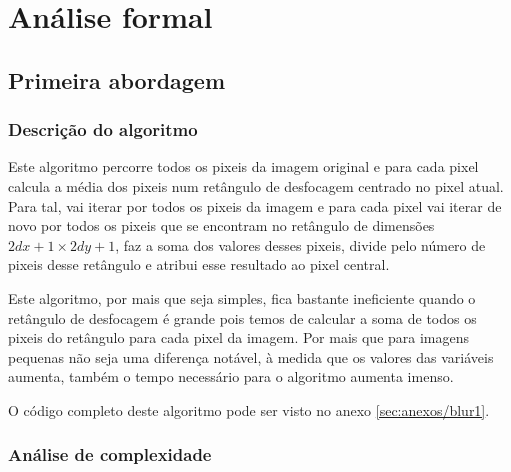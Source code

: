 \section{Análise formal}
\label{sec:imageblur/formal}

\subsection{Primeira abordagem}

\subsubsection{Descrição do algoritmo}

Este algoritmo percorre todos os pixeis da imagem original e para cada pixel calcula a média dos pixeis num retângulo de desfocagem centrado no pixel atual. Para tal, vai iterar por todos os pixeis da imagem e para cada pixel vai iterar de novo por todos os pixeis que se encontram no retângulo de dimensões $2dx+1 \times 2dy+1$, faz a soma dos valores desses pixeis, divide pelo número de pixeis desse retângulo e atribui esse resultado ao pixel central.

Este algoritmo, por mais que seja simples, fica bastante ineficiente quando o retângulo de desfocagem é grande pois temos de calcular a soma de todos os pixeis do retângulo para cada pixel da imagem. Por mais que para imagens pequenas não seja uma diferença notável, à medida que os valores das variáveis aumenta, também o tempo necessário para o algoritmo aumenta imenso.

O código completo deste algoritmo pode ser visto no anexo \ref{sec:anexos/blur1}.

\subsubsection{Análise de complexidade}


